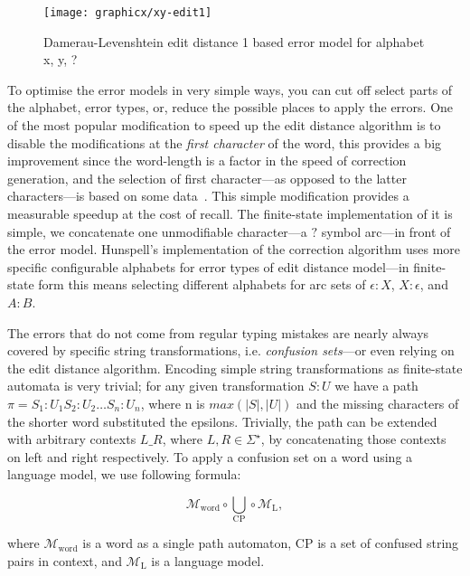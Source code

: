 \documentclass[a4paper,12pt]{article}
\begin{document}
\begin{figure}
    \centering
    \texttt{[image: graphicx/xy-edit1]}
    \caption{Damerau-Levenshtein edit distance 1 based error model for
        alphabet {x, y, ?}
    \label{fig:xy-edit-1}}
\end{figure}

To optimise the error models in very simple ways, you can cut off select parts
of the alphabet, error types, or, reduce the possible places to apply the
errors.  One of the most popular modification to speed up the edit distance
algorithm is to disable the modifications at the \emph{first character} of the
word, this provides a big improvement since the word-length is a factor in the
speed of correction generation, and the selection of first character---as
opposed to the latter characters---is based on some
data~\cite[]{bhagat2007spelling}.  This simple modification provides a
measurable speedup at the cost of recall. The finite-state implementation of it
is simple, we concatenate one unmodifiable character---a $?$ symbol arc---in
front of the error model.  Hunspell's implementation of the correction
algorithm uses more specific configurable alphabets for error types of edit
distance model---in finite-state form this means selecting different alphabets
for arc sets of $\epsilon:X$, $X:\epsilon$, and $A:B$.

The errors that do not come from regular typing mistakes are
nearly always covered by specific string transformations, i.e.
\emph{confusion sets}---or even relying on the edit distance algorithm.
Encoding simple string transformations as finite-state automata is very
trivial; for any given transformation $S:U$ we have a path $\pi = S_1:U_1
S_2:U_2 \ldots S_n:U_n$, where n is $max(|S|, |U|)$ and the missing characters
of the shorter word substituted the epsilons.  Trivially, the path can be
extended with arbitrary contexts $L \_ R$, where $L, R \in \Sigma^{\star}$, by
concatenating those contexts on left and right respectively. To apply a
confusion set on a word using a language model, we use following formula:

\begin{equation}
    \mathcal{M}_{\mathrm{word}} \circ \bigcup_{\mathrm{CP}} \circ \mathcal{M}_{\mathrm{L}},
\end{equation}

where $\mathcal{M}_{\mathrm{word}}$ is a word as a single path automaton,
$\mathrm{CP}$ is a set of confused string pairs in context, and
$\mathcal{M}_{\mathrm{L}}$ is a language model.
\end{document}
